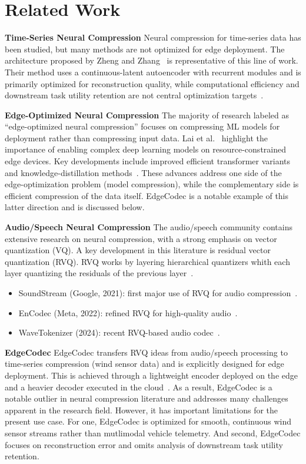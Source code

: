 \section{Related Work}

\textbf{Time-Series Neural Compression} Neural compression for time-series data has been studied, but many methods are not optimized for edge deployment. The architecture proposed by Zheng and Zhang~\cite{Zheng2023} is representative of this line of work. Their method uses a continuous-latent autoencoder with recurrent modules and is primarily optimized for reconstruction quality, while computational efficiency and downstream task utility retention are not central optimization targets~\cite{Zheng2023}.

\textbf{Edge-Optimized Neural Compression} The majority of research labeled as ``edge-optimized neural compression'' focuses on compressing ML models for deployment rather than compressing input data. Lai et al.~\cite{Lai2026} highlight the importance of enabling complex deep learning models on resource-constrained edge devices. Key developments include improved efficient transformer variants and knowledge-distillation methods~\cite{Lai2026}. These advances address one side of the edge-optimization problem (model compression), while the complementary side is efficient compression of the data itself. EdgeCodec is a notable example of this latter direction and is discussed below.

\textbf{Audio/Speech Neural Compression} The audio/speech community contains extensive research on neural compression, with a strong emphasis on vector quantization (VQ). A key development in this literature is residual vector quantization (RVQ). RVQ works by layering hierarchical quantizers whith each layer quantizing the residuals of the previous layer~\cite[pp.~495--507]{Zeghidour2021}.

\begin{itemize}
    \item SoundStream (Google, 2021): first major use of RVQ for audio compression~\cite[pp.~495--507]{Zeghidour2021}.
    \item EnCodec (Meta, 2022): refined RVQ for high-quality audio~\cite{Defossez2022}.
    \item WaveTokenizer (2024): recent RVQ-based audio codec~\cite{Ji2025}.
\end{itemize}

\textbf{EdgeCodec} EdgeCodec transfers RVQ ideas from audio/speech processing to time-series compression (wind sensor data) and is explicitly designed for edge deployment. This is achieved through a lightweight encoder deployed on the edge and a heavier decoder executed in the cloud~\cite{Hodo2025}. As a result, EdgeCodec is a notable outlier in neural compression literature and addresses many challenges apparent in the research field. However, it has important limitations for the present use case. For one, EdgeCodec is optimized for smooth, continuous wind sensor streams rather than mutlimodal vehicle telemetry. And second, EdgeCodec focuses on reconstruction error and omits analysis of downstream task utility retention.

